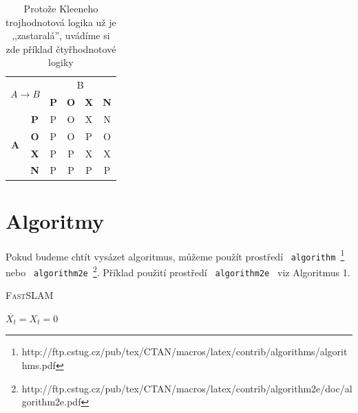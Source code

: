 \documentclass[a4paper,11pt]{article}
\begin{document}
\begin{center}
\begin{table}[ht]
\begin{minipage}[t]{0.25\textwidth}
\begin{tabular}{|c|c|c|c|c|c|}
                    \hline
                    \multicolumn{2}{|c|}{\multirow{2}{*}{$A \to B$}} & \multicolumn{4}{c|}{B} \\ 
                    \cline{3-6}
                    \multicolumn{2}{|c|}{} & \textbf{P} & \textbf{O} & \textbf{X} & \textbf{N} \\ 
                    \hline
                    \multirow{4}{*}{\textbf{A}} & \textbf{P} & P & O & X & N \\ 
                    \cline{2-6}
                    & \textbf{O} & P & O & P & O \\ 
                    \cline{2-6}
                    & \textbf{X} & P & P & X & X \\ 
                    \cline{2-6}
                    & \textbf{N} & P & P & P & P \\ 
                    \hline
                \end{tabular}
                \label{tab:implikace}
            \end{minipage}
            \caption{Protože Kleeneho trojhodnotová logika už je ,,zastaralá'', uvádíme si zde příklad čtyřhodnotové logiky}
            \label{tab:quadtabule}
        \end{table}

    \end{center}
    \pagebreak
    \section{Algoritmy}
    Pokud budeme chtít vysázet algoritmus, můžeme použít prostředí \texttt{ algorithm }\footnote{http://ftp.cstug.cz/pub/tex/CTAN/macros/latex/contrib/algorithms/algorithms.pdf} nebo \texttt{ algorithm2e }\footnote{http://ftp.cstug.cz/pub/tex/CTAN/macros/latex/contrib/algorithm2e/doc/algorithm2e.pdf}.
    Příklad použití prostředí \texttt{ algorithm2e } viz Algoritmus 1.
    \IncMargin{1.5em}
    \begin{algorithm}
        \SetAlgoLined
        \DontPrintSemicolon
        \LinesNumbered
        \SetNlSty{}{}{}
        \caption{\textsc{FastSLAM}}
        \label{alg:cap}
        
        \DecMargin{1.5em}
        $\overline{X_t} = X_t = 0$\;
        \SetAlgoNoLine
        \SetAlgoNoLine
    \end{algorithm}
\end{document}
